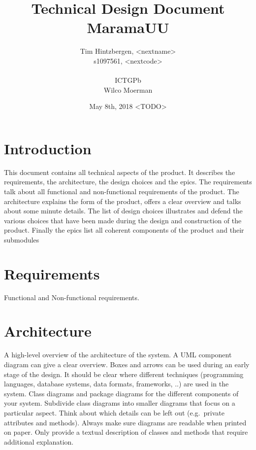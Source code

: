 \documentclass[10pt]{extarticle} %
\title{\huge Technical Design Document MaramaUU}
\author{Tim Hintzbergen, <nextname>    \\s1097561, <nextcode>
\\\\ICTGPb
\\Wilco Moerman}
\date{May 8th, 2018 <TODO>}
\begin{document}
    \maketitle
    \thispagestyle{empty}
    \newpage
    \newpage
    \setcounter{page}{1}
    \section {Introduction}
    This document contains all technical aspects of the product.
    It describes the requirements, the architecture, the design choices and the epics.
    The requirements talk about all functional and non-functional requirements of the product.
    The architecture explains the form of the product, offers a clear overview and talks about some minute details.
    The list of design choices illustrates and defend the various choices that have been made during the design and construction of the product.
    Finally the epics list all coherent components of the product and their submodules
    \newpage

    \tableofcontents{}
    \newpage

    \section{Requirements}
    Functional and Non-functional requirements.
    \newpage

    \section{Architecture}
    A high-level overview of the architecture of the system.
    A UML component diagram can give a clear overview.
    Boxes and arrows can be used during an early stage of the design.
    It should be clear where different techniques (programming languages, database systems, data formats, frameworks, ..) are used in the system.
    Class diagrams and package diagrams for the different components of your system.
    Subdivide class diagrams into smaller diagrams that focus on a particular aspect.
    Think about which details can be left out (e.g.\ private attributes and methods).
    Always make sure diagrams are readable when printed on paper.
    Only provide a textual description of classes and methods that require additional explanation.
\end{document}
